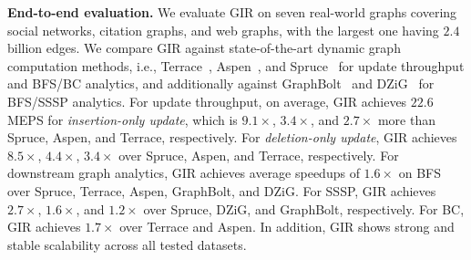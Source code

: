 \begin{maybecut}
\textbf{End-to-end evaluation.}
We evaluate GIR on seven real-world graphs covering social networks,
citation graphs, and web graphs, with the largest one having $2.4$ billion edges.
We compare GIR against state-of-the-art dynamic graph computation methods, i.e., Terrace~\cite{pandey2021terrace}, Aspen~\cite{dhulipala2019low}, and Spruce~\cite{shi2024spruce} for update throughput and BFS/BC analytics, and additionally against GraphBolt~\cite{mariappan2019graphbolt} and DZiG~\cite{mariappan2021dzig} for BFS/SSSP analytics.
For update throughput,
on average, GIR achieves $22.6$ MEPS for \textit{insertion-only update}, which is $9.1\times$, $3.4\times$, and $2.7\times$ more than Spruce, Aspen, and Terrace, respectively.
For \textit{deletion-only update}, GIR achieves $8.5\times$, $4.4\times$, $3.4\times$ over Spruce, Aspen, and Terrace, respectively.
For downstream graph analytics, GIR achieves average speedups of $1.6\times$ on BFS over Spruce, Terrace, Aspen, GraphBolt, and DZiG.
For SSSP, GIR achieves $2.7\times$, $1.6\times$, and $1.2\times$ over Spruce, DZiG, and GraphBolt, respectively.
For BC, GIR achieves $1.7\times$ over Terrace and Aspen.
In addition, GIR shows strong and stable scalability across all tested datasets.
\end{maybecut}



